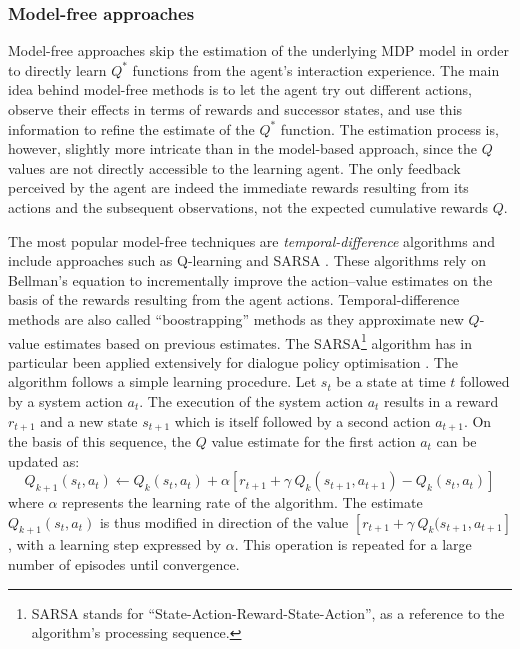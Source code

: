 \subsubsection{Model-free approaches}

Model-free approaches skip the estimation of the underlying MDP model in order to directly learn $Q^*$ functions from the agent's interaction experience.  The main idea behind model-free methods is to let the agent try out different actions, observe their effects in terms of rewards and successor states, and use this information to refine the estimate of the $Q^*$ function. The estimation process is, however, slightly more intricate than in the model-based approach, since the $Q$ values are not directly accessible to the learning agent.  The only feedback perceived by the agent are indeed the immediate rewards resulting from its actions and the subsequent observations, not the expected cumulative rewards $Q$.  

The most popular model-free techniques are \textit{temporal-difference} algorithms and include approaches such as Q-learning \citep{watkins92} and SARSA \citep{rummery:phd95}.  These algorithms rely on Bellman's equation to incrementally improve the action--value estimates on the basis of the rewards resulting from the agent actions. Temporal-difference methods are also called ``boostrapping'' methods as they approximate new $Q$-value estimates based on previous estimates. The SARSA\footnote{SARSA stands for ``State-Action-Reward-State-Action'', as a reference to the algorithm's processing sequence.} algorithm has in particular been applied extensively for dialogue policy optimisation \citep{RieserLemon11}.  The algorithm follows a simple learning procedure. Let $s_t$ be a state at time $t$ followed by a system action $a_t$. The execution of the system action $a_t$ results in a reward $r_{t+1}$ and a new state $s_{t+1}$ which is itself followed by a second action $a_{t+1}$.  On the basis of this sequence, the $Q$ value estimate for the first action $a_t$ can be updated as:
\begin{equation}
Q_{k+1}(s_t, a_t) \leftarrow Q_{k}(s_t,a_t) + \alpha \left[r_{t+1} + \gamma \ Q_{k}(s_{t+1}, a_{t+1}) - Q_{k}(s_t, a_t) \right] \label{eq:sarsa}
\end{equation}
where $\alpha$ represents the learning rate of the algorithm. The estimate $Q_{k+1}(s_t, a_t)$ is thus modified in direction of the value $ \left[r_{t+1} + \gamma \ Q_{k}(s_{t+1}, a_{t+1} \right]$, with a learning step expressed by $\alpha$. This operation is repeated for a large number of episodes until convergence.  

